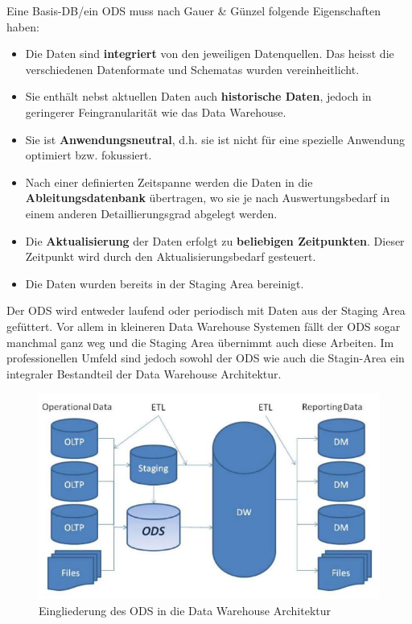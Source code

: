 \documentclass[a4paper, 11pt]{article}
\begin{document}
Eine Basis-DB/ein ODS muss nach Gauer \& Günzel folgende Eigenschaften haben:
\begin{itemize}
	\item Die Daten sind \textbf{integriert} von den jeweiligen Datenquellen. Das heisst die verschiedenen Datenformate und Schematas wurden vereinheitlicht.
	\item Sie enthält nebst aktuellen Daten auch \textbf{historische Daten}, jedoch in geringerer Feingranularität wie das Data Warehouse.
	\item Sie ist \textbf{Anwendungsneutral}, d.h. sie ist nicht für eine spezielle Anwendung optimiert bzw. fokussiert.
	\item Nach einer definierten Zeitspanne werden die Daten in die \textbf{Ableitungsdatenbank} übertragen, wo sie je nach Auswertungsbedarf in einem anderen Detaillierungsgrad abgelegt werden.
	\item Die \textbf{Aktualisierung} der Daten erfolgt zu \textbf{beliebigen Zeitpunkten}. Dieser Zeitpunkt wird durch den Aktualisierungsbedarf gesteuert.
	\item Die Daten wurden bereits in der Staging Area bereinigt.
\end{itemize}

\vspace{10px}

\noindent Der ODS wird entweder laufend oder periodisch mit Daten aus der Staging Area gefüttert. Vor allem in kleineren Data Warehouse Systemen fällt der ODS sogar manchmal ganz weg und die Staging Area übernimmt auch diese Arbeiten. Im professionellen Umfeld sind jedoch sowohl der ODS wie auch die Stagin-Area ein integraler Bestandteil der Data Warehouse Architektur. 

\begin{figure}[htb]
	\centering
	\includegraphics[keepaspectratio=true,height=15\baselineskip]{ODS.png}
	\caption{Eingliederung des ODS in die Data Warehouse Architektur}
	\label{fig:ODS}
\end{figure}
\end{document}
